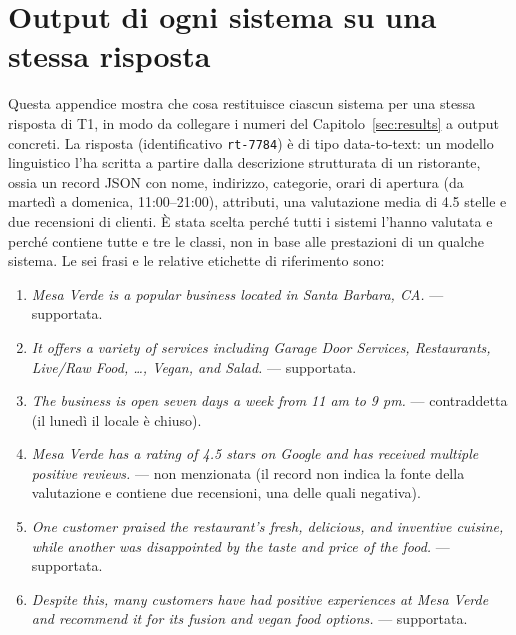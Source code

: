 \chapter{Output di ogni sistema su una stessa risposta}
\label{app:examples}


Questa appendice mostra che cosa restituisce ciascun sistema per una stessa risposta di T1, in modo da collegare i numeri
del Capitolo~\ref{sec:results} a output concreti. La risposta (identificativo \texttt{rt-7784}) è di tipo data-to-text:
un modello linguistico l'ha scritta a partire dalla descrizione strutturata di un ristorante, ossia un record JSON con
nome, indirizzo, categorie, orari di apertura (da martedì a domenica, 11:00--21:00), attributi, una valutazione media di
4.5 stelle e due recensioni di clienti. È stata scelta perché tutti i sistemi l'hanno valutata e perché contiene tutte e
tre le classi, non in base alle prestazioni di un qualche sistema. Le sei frasi e le relative etichette di riferimento
sono:

\begin{enumerate}
\item \emph{Mesa Verde is a popular business located in Santa Barbara, CA.} --- supportata.
\item \emph{It offers a variety of services including Garage Door Services, Restaurants, Live/Raw Food, \dots, Vegan, and
Salad.} --- supportata.
\item \emph{The business is open seven days a week from 11 am to 9 pm.} --- contraddetta (il lunedì il locale è chiuso).
\item \emph{Mesa Verde has a rating of 4.5 stars on Google and has received multiple positive reviews.} --- non menzionata
(il record non indica la fonte della valutazione e contiene due recensioni, una delle quali negativa).
\item \emph{One customer praised the restaurant's fresh, delicious, and inventive cuisine, while another was
disappointed by the taste and price of the food.} --- supportata.
\item \emph{Despite this, many customers have had positive experiences at Mesa Verde and recommend it for its fusion and
vegan food options.} --- supportata.
\end{enumerate}

